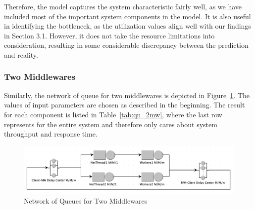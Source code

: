 Therefore, the model captures the system characteristic fairly well, as we have included most of the important system components in the model. It is also useful in identifying the bottleneck, as the utilization values align well with our findings in Section 3.1. However, it does not take the resource limitations into consideration, resulting in some considerable discrepancy between the prediction and reality.

\subsubsection{Two Middlewares}

Similarly, the network of queue for two middlewares is depicted in Figure~\ref{fig:qn_2mw}. The values of input parameters are chosen as described in the beginning. The result for each component is listed in Table~\ref{tab:qn_2mw}, where the last row represents for the entire system and therefore only cares about system throughput and response time.

\begin{figure}[!ht]
\centering
\includegraphics[width=1.0\textwidth]{img/7_qn_2mw.png}
\captionsetup{justification=centering}
\caption{\label{fig:qn_2mw}Network of Queues for Two Middlewares}
\end{figure}

